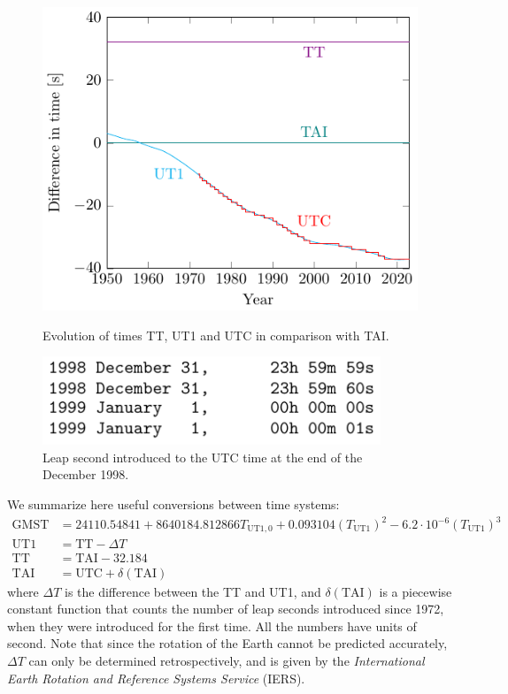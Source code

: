 \documentclass[../main.tex]{subfiles}
\begin{document}
\begin{figure}[htbp]
  \centering
  \begin{minipage}[ht]{0.45\textwidth}
    \centering
    \includegraphics[width=\textwidth]{Images/time_graph.pdf}
    \caption{Evolution of times TT, UT1 and UTC in comparison with TAI. \cite{iersDeltaT}}
    \label{fig:time_graph}
  \end{minipage}
  \hfill
  \begin{minipage}[ht]{0.45\textwidth}
    \centering
    \includegraphics[width=0.9\textwidth]{Images/leap_second.pdf}
    \caption{Leap second introduced to the UTC time at the end of the December 1998. \cite{iersbulletinC}}
    \label{fig:leapsecond}
  \end{minipage}
\end{figure}
We summarize here useful conversions between time systems:
\begin{align*}
  \text{GMST} & =24110.54841+8640184.812866{T_{\text{UT1},0}}+0.093104{(T_\text{UT1})}^2-6.2\cdot 10^{-6}{(T_\text{UT1})}^3 \\
  \text{UT1}  & =\text{TT}-\Delta T                                                                                         \\
  \text{TT}   & =\text{TAI}-32.184                                                                                          \\
  \text{TAI}  & =\text{UTC}+\delta(\text{TAI})
\end{align*}
where $\Delta T$ is the difference between the TT and UT1, and $\delta(\text{TAI})$ is a piecewise constant function that counts the number of leap seconds introduced since 1972, when they were introduced for the first time. All the numbers have units of second. Note that since the rotation of the Earth cannot be predicted accurately, $\Delta T$ can only be determined retrospectively, and is given by the \emph{International Earth Rotation and Reference Systems Service} (IERS).
\end{document}
